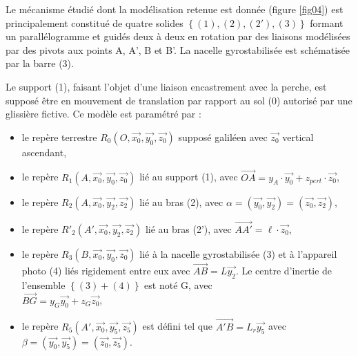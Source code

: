 Le mécanisme étudié dont la modélisation retenue est donnée (figure \ref{fig04}) est principalement constitué de quatre solides $\left\{(1), (2), (2'), (3)\right\}$ formant un parallélogramme et guidés deux à deux en rotation par des liaisons modélisées par des pivots aux points A, A', B et B'. La nacelle gyrostabilisée est schématisée par la barre (3).

Le support (1), faisant l'objet d'une liaison encastrement avec la perche, est supposé être en mouvement de translation par rapport au sol (0) autorisé par une glissière fictive. Ce modèle est paramétré par :
\begin{itemize}
 \item le repère terrestre $R_0(O,\overrightarrow{x_0},\overrightarrow{y_0},\overrightarrow{z_0})$ supposé galiléen avec $\overrightarrow{z_0}$ vertical ascendant,
 \item le repère $R_1(A,\overrightarrow{x_0},\overrightarrow{y_0},\overrightarrow{z_0})$ lié au support (1), avec $\overrightarrow{OA}=y_A\cdot\overrightarrow{y_0}+z_{pert}\cdot\overrightarrow{z_0}$,
 \item le repère $R_2(A,\overrightarrow{x_0},\overrightarrow{y_2},\overrightarrow{z_2})$ lié au bras (2), avec $\alpha=(\overrightarrow{y_0},\overrightarrow{y_2})=(\overrightarrow{z_0},\overrightarrow{z_2})$, 
 \item le repère $R'_2(A',\overrightarrow{x_0},\overrightarrow{y_2},\overrightarrow{z_2})$ lié au bras (2'), avec $\overrightarrow{AA'}=\ell\cdot\overrightarrow{z_0}$,
 \item le repère $R_3(B,\overrightarrow{x_0},\overrightarrow{y_0},\overrightarrow{z_0})$ 	lié à la nacelle gyrostabilisée (3) et à l'appareil photo (4) liés rigidement entre eux
avec $\overrightarrow{AB}=L\overrightarrow{y_2}$. Le centre d'inertie de l'ensemble $\left\{(3) + (4)\right\}$ est noté G, avec \\ $\overrightarrow{BG}=y_G\overrightarrow{y_0}+z_G\overrightarrow{z_0}$,
\item le repère $R_5(A',\overrightarrow{x_0},\overrightarrow{y_5},\overrightarrow{z_5})$ est défini tel que $\overrightarrow{A'B}=L_r\overrightarrow{y_5}$ avec $\beta=(\overrightarrow{y_0},\overrightarrow{y_5})=(\overrightarrow{z_0},\overrightarrow{z_5})$.
\end{itemize}

